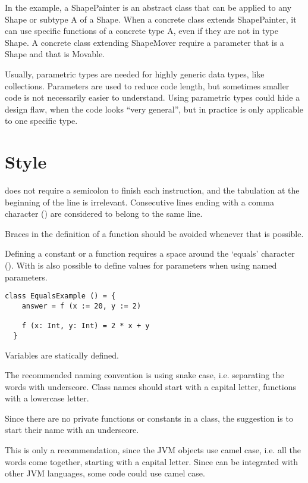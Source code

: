 In the example, a ShapePainter is an abstract class that can be applied to any Shape or subtype A of a Shape.
When a concrete class extends ShapePainter, it can use specific functions of a concrete type A, even if they are not in type Shape.
A concrete class extending ShapeMover require a parameter that is a Shape and that is Movable.

Usually, parametric types are needed for highly generic data types, like collections.
Parameters are used to reduce code length, but sometimes smaller code is not necessarily easier to understand.
Using parametric types could hide a design flaw, when the code looks ``very general'', but in practice is only applicable to one specific type.


\section{Style}

\Soda does not require a semicolon to finish each instruction, and the tabulation at the beginning of the line is irrelevant.
Consecutive lines ending with a comma character (\srccode{,}) are considered to belong to the same line.

Braces in the definition of a function should be avoided whenever that is possible.

Defining a constant or a function requires a space around the `equals' character (\sdef).
With \sdefparam is also possible to define values for parameters when using named parameters.

\begin{lstlisting}[label={lst:exampleFunctionWithoutBraces}]
  class EqualsExample () = {
    answer = f (x := 20, y := 2)

    f (x: Int, y: Int) = 2 * x + y
  }
\end{lstlisting}


Variables are statically defined.

The recommended naming convention is using snake case, i.e. separating the words with underscore.
Class names should start with a capital letter, functions with a lowercase letter.

Since there are no private functions or constants in a class, the suggestion is to start their name with an underscore.

This is only a recommendation, since the JVM objects use camel case, i.e. all the words come together, starting with a capital letter.
Since \Soda can be integrated with other JVM languages, some \Soda code could use camel case.

